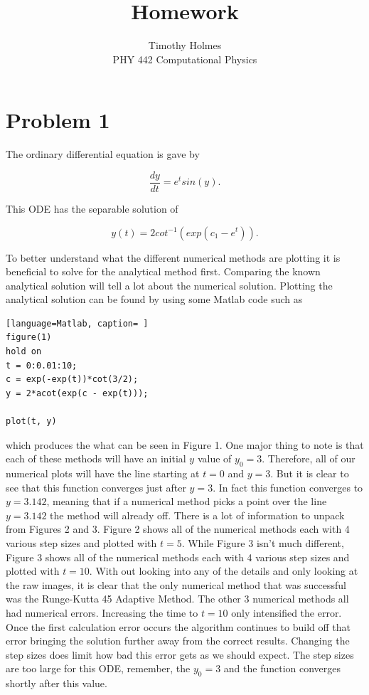 \documentclass[12pt]{article}
\begin{document}
 
 
\title{Homework }
\author{Timothy Holmes\\ %
PHY 442 Computational Physics}

\maketitle

\section*{Problem 1}

The ordinary differential equation is gave by

$$
\frac{dy}{dt} = e^{t}sin(y).
$$

This ODE has the separable solution of

$$
y(t) = 2cot^{-1}(exp(c_{1} - e^{t})).
$$

To better understand what the different numerical methods are plotting it is beneficial to solve for the analytical method first. Comparing the known analytical solution will tell a lot about the numerical solution. Plotting the analytical solution can be found by using some Matlab code such as

\begin{lstlisting}[language=Matlab, caption= ]
figure(1)
hold on
t = 0:0.01:10;
c = exp(-exp(t))*cot(3/2);
y = 2*acot(exp(c - exp(t)));

plot(t, y)
\end{lstlisting}

which produces the what can be seen in Figure 1. One major thing to note is that each of these methods will have an initial $y$ value of $y_{0} = 3$. Therefore, all of our numerical plots will have the line starting at $t = 0$ and $y = 3$. But it is clear to see that this function converges just after $y = 3$. In fact this function converges to $y = 3.142$, meaning that if a numerical method  picks a point over the line $y = 3.142$ the method will already off. There is a lot of information to unpack from Figures 2 and 3. Figure 2 shows all of the numerical methods each with 4 various step sizes and plotted with $t = 5$. While Figure 3 isn't much different, Figure 3 shows all of the numerical methods each with 4 various step sizes and plotted with $t = 10$. With out looking into any of the details and only looking at the raw images, it is clear that the only numerical method that was successful was the Runge-Kutta 45 Adaptive Method. The other 3 numerical methods all had numerical errors. Increasing the time to $t = 10$ only intensified the error. Once the first calculation error occurs the algorithm continues to build off that error bringing the solution further away from the correct results. Changing the step sizes does limit how bad this error gets as we should expect. The step sizes are too large for this ODE, remember, the $y_{0} = 3$ and the function converges shortly after this value. 
\end{document}

